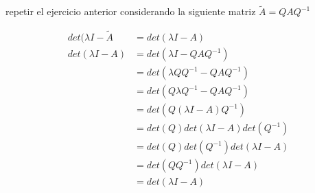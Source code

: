 repetir el ejercicio anterior considerando la siguiente matriz \(\tilde{A}=QAQ^{-1}\)

\[
    \begin{split}
        det(\lambda I-\tilde{A} & = det(\lambda I-A )\\
        det(\lambda I-A) & = det(\lambda I-QAQ^{-1})\\
        & = det(\lambda QQ^{-1}-QAQ^{-1})\\
        & = det(Q\lambda Q^{-1}-QAQ^{-1})\\
        & = det(Q(\lambda I-A)Q^{-1})\\
        & = det(Q) det(\lambda I-A) det(Q^{-1})\\
        & = det(Q) det(Q^{-1}) det(\lambda I-A)\\
        & = det(QQ^{-1}) det(\lambda I-A)\\
        & = det(\lambda I-A)
    \end{split}
\]

